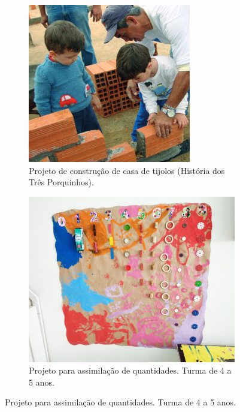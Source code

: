\begin{figure}[!h]
   \centering
   \begin{subfigure}{.45\linewidth}
       \includegraphics[width=.8\linewidth,fbox]{figs/tres_porquinhos.png}
       \caption{Projeto de construção de casa de tijolos (História dos Três Porquinhos).}
       \label{fig:tres_porquinhos}
   \end{subfigure}%
   \hspace{.05\textwidth}%
   \begin{subfigure}{.45\textwidth}
       \includegraphics[width=.8\linewidth,fbox]{figs/projeto_numeros_menor.jpeg}
       \caption{Projeto para assimilação de quantidades. Turma de 4 a 5 anos.}
       \label{fig:projeto_numeros}
   \end{subfigure}%
\end{figure}

